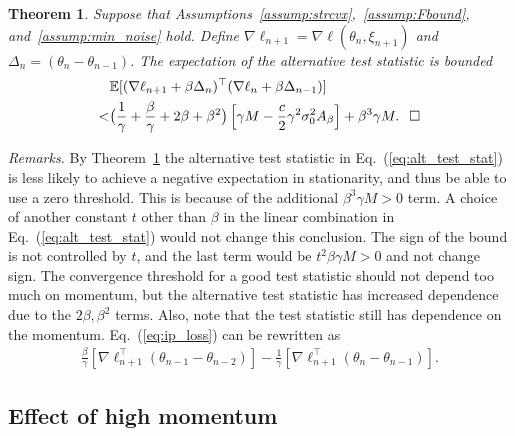 \documentclass[conference]{IEEEtran}
\newcommand{\Ex}[1]{\mathbb{E}[ #1 ]}
\newtheorem{theorem}{Theorem}
\begin{document}
\begin{theorem}
\label{thm:ip_opt}
Suppose that Assumptions~\ref{assump:strcvx},~\ref{assump:Fbound}, and~\ref{assump:min_noise} hold.
Define $\nabla \ell_{n+1} = \nabla \ell (\theta_n, \xi_{n+1})$ and $\Delta_n = (\theta_n - \theta_{n-1})$.
The expectation of the alternative test statistic is bounded
\begin{align}\label{eq:alt_test_stat}
&\Ex{ ( \nabla \ell _{n+1} + \beta \Delta_n )^\top ( \nabla \ell_n + \beta \Delta_{n-1} ) } \\\notag
<& \big( \frac{1}{\gamma} + \frac{\beta}{\gamma} + 2 \beta + \beta^2 \big) \left[ \gamma M - \frac{c}{2} \gamma^2 \sigma_0^2 A_\beta \right]
+ \beta^3 \gamma M.\hspace{0.1in}\Box
\end{align}
\end{theorem}
\emph{Remarks.}
By Theorem~\ref{thm:ip_opt} the alternative test statistic in Eq.~(\ref{eq:alt_test_stat}) is less likely to achieve a negative expectation in stationarity, and thus be able to use a zero threshold.
This is because of the additional $\beta^3 \gamma M > 0$ term.
A choice of another constant $t$ other than $\beta$ in the linear combination  in Eq.~(\ref{eq:alt_test_stat}) would not change this conclusion.  The sign of the bound is not controlled by $t$, and the last term would be $t^2 \beta \gamma M > 0$ and not change sign.
The convergence threshold for a good test statistic should not depend too much on momentum, but the alternative test statistic has increased dependence due to the $2\beta, \beta^2$ terms. Also, note that the test statistic still has dependence on the momentum. Eq.~(\ref{eq:ip_loss}) can be rewritten as 
\begin{align}
\label{eq:ip_breakdown}
\frac{\beta}{\gamma} [ \nabla \ell_{n+1}^\top (\theta_{n-1} - \theta_{n-2} ) ]
- \frac{1}{\gamma} [ \nabla \ell_{n+1}^\top ( \theta_n - \theta_{n-1} )].
\end{align}

\subsection{Effect of high momentum}
\end{document}
